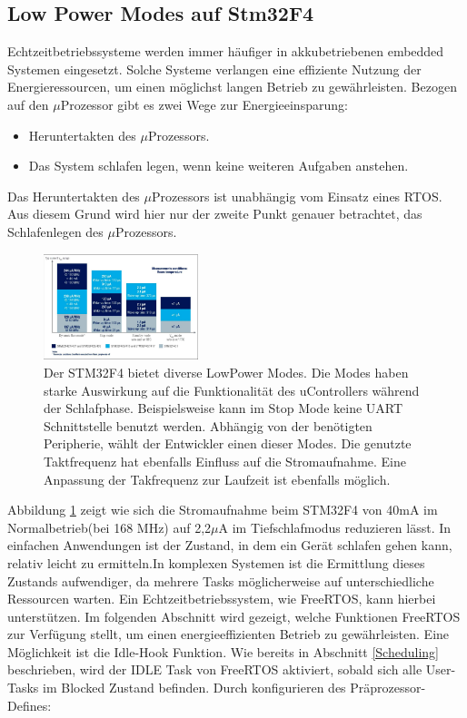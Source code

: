 \subsection{Low Power Modes auf Stm32F4}
\label{sec:Low Power Modes}
Echtzeitbetriebssysteme werden immer häufiger in akkubetriebenen embedded Systemen eingesetzt. Solche Systeme verlangen eine effiziente Nutzung der Energieressourcen, um einen möglichst langen Betrieb zu ge\-währ\-leis\-ten. Bezogen auf den $\mu$\-Pro\-zesso\-r gibt es zwei Wege zur Energieeinsparung:
\begin{itemize}
	\item Heruntertakten des $\mu$\-Pro\-zesso\-rs.
	\item Das System schlafen legen, wenn keine weiteren Aufgaben anstehen.
\end{itemize}
Das Heruntertakten des $\mu$\-Pro\-zesso\-rs ist unabhängig vom Einsatz eines RTOS. Aus diesem Grund wird hier nur der zweite Punkt genauer betrachtet, das Schlafenlegen des $\mu$\-Pro\-zesso\-rs. 
\begin{figure}[htb!]
	\centering
		\includegraphics[width=0.4\textwidth]{Pictures/STM32F4/powerConsumption.png}
	\caption{Der STM32F4 bietet diverse LowPower Modes. Die Modes haben starke Auswirkung auf die Funktionalität des uControllers während der Schlafphase. Beispielsweise kann im Stop Mode keine UART Schnittstelle benutzt werden. Abhängig von der benötigten Peripherie, wählt der Entwickler einen dieser Modes. Die genutzte Taktfrequenz hat ebenfalls Einfluss auf die Stromaufnahme. Eine Anpassung der Takfrequenz zur Laufzeit ist ebenfalls möglich.}
	\label{fig:powerconsum}
\end{figure}
Abbildung \ref{fig:powerconsum} zeigt wie sich die Stromaufnahme beim STM32F4 von 40mA im Normalbetrieb(bei 168 MHz) auf 2,2$\mu$A im Tiefschlafmodus reduzieren lässt. 
In einfachen Anwendungen ist der Zustand, in dem ein Gerät schlafen gehen kann, relativ leicht zu ermitteln.\newline In komplexen Systemen ist die Ermittlung dieses Zustands aufwendiger, da mehrere Tasks mög\-li\-cherweise auf unterschiedliche Ressourcen warten. Ein Echtzeitbetriebssystem, wie FreeRTOS, kann hierbei unterstützen. Im folgenden Abschnitt wird gezeigt, welche Funktionen FreeRTOS zur Ver\-fü\-gung stellt, um einen energieeffizienten Betrieb zu ge\-währ\-leis\-ten. Eine Mög\-lich\-keit ist die Idle-Hook Funktion. Wie bereits in Abschnitt \ref{Scheduling} beschrieben, wird der IDLE Task von FreeRTOS aktiviert, sobald sich alle User-Tasks im Blocked Zustand befinden. Durch konfigurieren des Präprozessor-Defines:        
